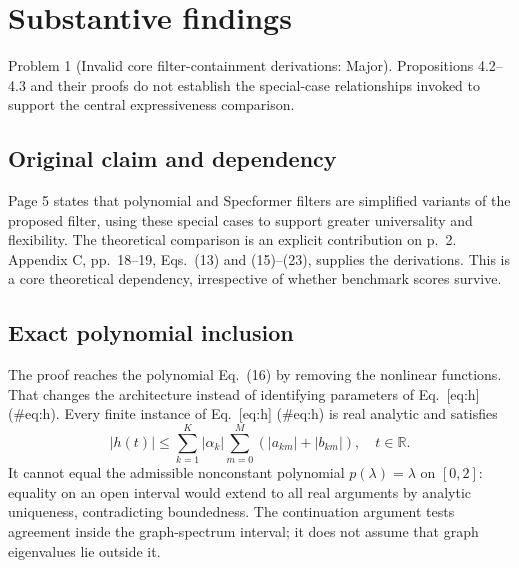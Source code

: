 \documentclass[10pt]{article}
\begin{document}
\section*{Substantive findings}
Problem 1 (Invalid core filter-containment derivations: Major).  Propositions 4.2–4.3 and their proofs do not establish the special-case relationships invoked to support the central expressiveness comparison.\par
\subsection*{Original claim and dependency}
Page 5 states that polynomial and Specformer filters are simplified variants of the proposed filter, using these special cases to support greater universality and flexibility. The theoretical comparison is an explicit contribution on p. 2. Appendix C, pp. 18–19, Eqs. (13) and (15)–(23), supplies the derivations. This is a core theoretical dependency, irrespective of whether benchmark scores survive.\par
\subsection*{Exact polynomial inclusion}
The proof reaches the polynomial Eq. (16) by removing the nonlinear functions. That changes the architecture instead of identifying parameters of Eq. [eq:h] (\#eq:h). Every finite instance of Eq. [eq:h] (\#eq:h) is real analytic and satisfies \[|h(t)|\leq\sum_{k=1}^{K}|\alpha_k|\sum_{m=0}^{M}(|a_{km}|+|b_{km}|),\quad t\in\mathbb R.\] It cannot equal the admissible nonconstant polynomial \(p(\lambda)=\lambda\) on \([0,2]\): equality on an open interval would extend to all real arguments by analytic uniqueness, contradicting boundedness. The continuation argument tests agreement inside the graph-spectrum interval; it does not assume that graph eigenvalues lie outside it.\par
\end{document}
